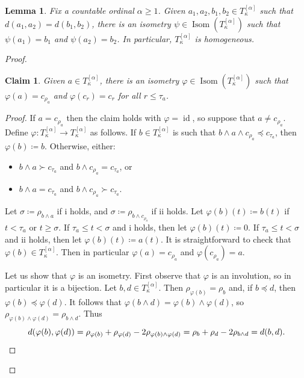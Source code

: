 \documentclass[11pt]{article}
\DeclareMathOperator{\id}{id}
\DeclareMathOperator{\Isom}{Isom}
\newtheorem{lemma}[theorem]{Lemma}
\newtheorem{claim}{Claim}
\theoremstyle{definition}
\theoremstyle{remark}
\begin{document}
\begin{lemma} \label{lem: 2-transitive}
    Fix a countable ordinal $\alpha \geq 1$. Given $a_1, a_2, b_1, b_2 \in T_\kappa^{[\alpha]}$ such that $d(a_1, a_2) = d(b_1, b_2)$, there is an isometry $\psi \in \Isom(T_\kappa^{[\alpha]})$ such that $\psi(a_1) = b_1$ and $\psi(a_2) = b_2$. In particular, $T_\kappa^{[\alpha]}$ is homogeneous.
\end{lemma}
\begin{proof}
    \begin{claim} \label{claim 1}
        Given $a \in T_\kappa^{[\alpha]}$, there is an isometry $\varphi \in \Isom(T_\kappa^{[\alpha]})$ such that $\varphi(a) = c_{\rho_a}$ and $\varphi(c_r) = c_r$ for all $r \leq \tau_a$.
    \end{claim}
    \begin{proof}
    \renewcommand{\qedsymbol}{$\blacksquare$}
        If $a = c_{\rho_a}$ then the claim holds with $\varphi = \id$, so suppose that $a \neq c_{\rho_a}$. Define $\varphi: T_\kappa^{[\alpha]} \rightarrow T_\kappa^{[\alpha]}$ as follows. If $b \in T_\kappa^{[\alpha]}$ is such that $b \wedge a \wedge c_{\rho_a} \preceq c_{\tau_a}$, then $\varphi(b) \coloneqq b$. Otherwise, either:
        \begin{itemize}
            \item[i.] $b \wedge a \succ c_{\tau_a}$ and $b \wedge c_{\rho_a} = c_{\tau_a}$, or
            \item[ii.] $b \wedge a = c_{\tau_a}$ and $b \wedge c_{\rho_a} \succ c_{\tau_a}$.
        \end{itemize}
        Let $\sigma \coloneqq \rho_{b \wedge a}$ if i holds, and $\sigma \coloneqq \rho_{b \wedge c_{\rho_a}}$ if ii holds.
        Let $\varphi(b)(t) \coloneqq  b(t)$ if $t < \tau_a$ or $t \geq \sigma$. If $\tau_a \leq t < \sigma$ and i holds, then let $\varphi(b)(t) \coloneqq 0$. If $\tau_a \leq t < \sigma$ and ii holds, then let $\varphi(b)(t) \coloneqq a(t)$. It is straightforward to check that $\varphi(b) \in T_\kappa^{[\alpha]}$.
        Then in particular $\varphi(a) = c_{\rho_a}$ and $\varphi(c_{\rho_a}) = a$.
        
        Let us show that $\varphi$ is an isometry. First observe that $\varphi$ is an involution, so in particular it is a bijection. Let $b, d \in T_\kappa^{[\alpha]}$. Then $\rho_{\varphi(b)} = \rho_b$ and, if $b \preceq d$, then $\varphi(b) \preceq \varphi(d)$. It follows that $\varphi(b \wedge d) = \varphi(b) \wedge \varphi(d)$, so $\rho_{\varphi(b) \wedge \varphi(d)} = \rho_{b \wedge d}$.
        Thus
        \[
            d(\varphi(b), \varphi(d)) 
            = \rho_{\varphi(b)} + \rho_{\varphi(d)} - 2\rho_{\varphi(b) \wedge \varphi(d)} 
            = \rho_b + \rho_d - 2\rho_{b \wedge d}
            = d(b,d).
            \qedhere
        \]
    \end{proof}
    

\end{proof}
\end{document}
